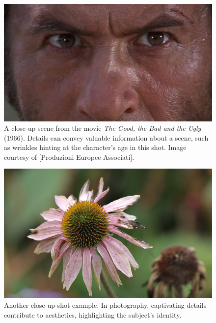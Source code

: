 \begin{figure}[ht]
  \centering

    \includegraphics[width=\linewidth]{Images/A scene from ‘The Good, the Bad and the Ugly’ (1966). Image courtesy- Produzioni Europee Associati .jpg}

   \caption{A close-up scene from the movie \textit{The Good, the Bad and the Ugly} (1966). Details can convey valuable information about a scene, such as wrinkles hinting at the character's age in this shot. Image courtesy of [Produzioni Europee Associati].}
   \label{fig:close-up1}
\end{figure}


\begin{figure}%
  \centering
   \includegraphics[width=\linewidth]{Images/flower-closeup.JPG}
   
   \caption{Another close-up shot example. In photography, captivating details contribute to aesthetics, highlighting the subject's identity.}
   \label{fig:close-up2}
\end{figure}

